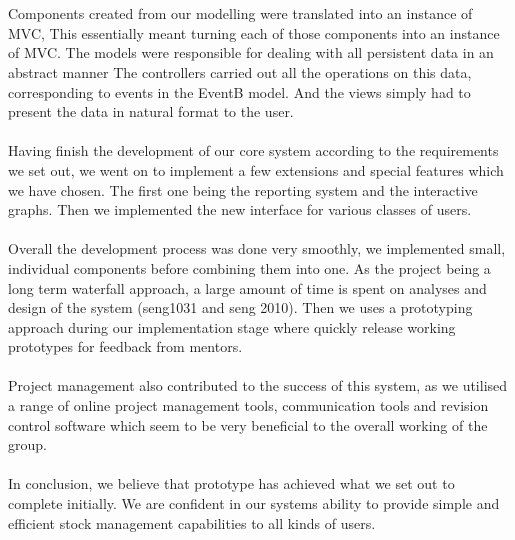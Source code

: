 \documentclass[a4paper]{article}
\begin{document}
\\\\
Components created from our modelling were translated into an instance of MVC, 
This essentially meant turning each of those components into an instance of MVC. The models were responsible for dealing with all persistent data in an abstract manner The controllers carried out all the operations on this data, corresponding to events in the EventB model. And the views simply had to present the data in natural format to the user.
\\\\
Having finish the development of our core system according to the requirements we set out, we went on to implement a few extensions and special features which we have chosen. The first one being the reporting system and the interactive graphs. Then we implemented the new interface for various classes of users. 
\\\\
Overall the development process was done very smoothly, we implemented small, individual components before combining them into one. As the project being a long term waterfall approach, a large amount of time is spent on analyses and design of the system (seng1031 and seng 2010). Then we uses a prototyping approach during our implementation stage where quickly release working prototypes for feedback from mentors. 
\\\\
Project management also contributed to the success of this system, as we utilised a range of online project management tools, communication tools and revision control software which seem to be very beneficial to the overall working of the group. 
\\\\
In conclusion, we believe that prototype has achieved what we set out to complete initially. We are confident in our systems ability to provide simple and efficient stock management capabilities to all kinds of users. 

\pagebreak
\end{document}
